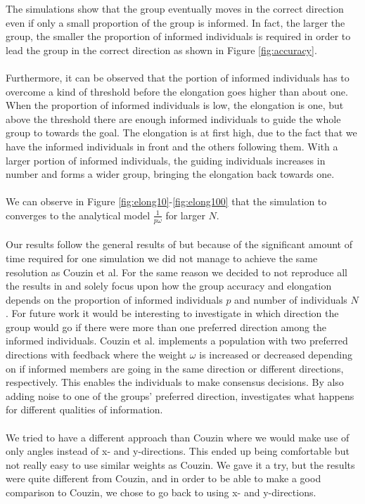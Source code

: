 The simulations show that the group eventually moves in the correct direction even if only a small proportion of the group is informed. 
In fact, the larger the group, the smaller the proportion of informed individuals is required in order to lead the group in the correct direction as shown in Figure \ref{fig:accuracy}.
\\\\
Furthermore, it can be observed that the portion of informed individuals has to overcome a kind of threshold before the elongation goes higher than about one. 
When the proportion of informed individuals is low, the elongation is one, but above the threshold there are enough informed individuals to guide the whole group to towards the goal. 
The elongation is at first high, due to the fact that we have the informed individuals in front and the others following them. 
With a larger portion of informed individuals, the guiding individuals increases in number and forms a wider group, bringing the elongation back towards one.
\\\\
We can observe in Figure \ref{fig:elong10}-\ref{fig:elong100} that the simulation to converges to the analytical model $\frac{1}{p\omega}$ for larger $N$.
\\\\
Our results follow the general results of \cite{theArticle} but because of the significant amount of time required for one simulation we did not manage to achieve the same resolution as Couzin et al. For the same reason we decided to not reproduce all the results in \cite{theArticle} and solely focus upon how the group accuracy and elongation depends on the proportion of informed individuals $p$ and number of individuals $N$. For future work it would be interesting to investigate in which direction the group would go if there were more than one preferred direction among the informed individuals. Couzin et al. implements a population with two preferred directions with feedback where the weight $\omega$ is increased or decreased depending on if informed members are going in the same direction or different directions, respectively. This enables the individuals to make consensus decisions. By also adding noise to one of the groups' preferred direction, \cite{theArticle} investigates what happens for different qualities of information.
\\\\
We tried to have a different approach than Couzin where we would make use of only angles instead of x- and y-directions. 
This ended up being comfortable but not really easy to use similar weights as Couzin. 
We gave it a try, but the results were quite different from Couzin, and in order to be able to make a good comparison to Couzin, we chose to go back to using x- and y-directions.

